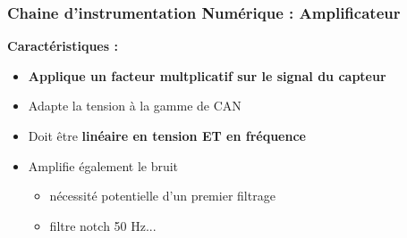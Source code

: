 \documentclass{beamer}
\begin{document}
\begin{frame}
\frametitle{Chaine d'instrumentation Numérique : Amplificateur}
\begin{center}
\end{center}
\vspace{0.1cm}
\textbf{Caractéristiques :}\\
\vspace{0.1cm}
\begin{itemize}
\item \textbf{Applique un facteur multplicatif sur le signal du capteur}
\vspace{0.1cm}
\item Adapte la tension à la gamme de CAN
\vspace{0.1cm}
\item Doit être \textbf{linéaire en tension ET en fréquence}
\vspace{0.1cm}
\item Amplifie également le bruit 
\vspace{0.1cm}
\begin{itemize}
\item nécessité potentielle d'un premier filtrage 
\vspace{0.1cm}
\item  filtre notch 50 Hz...
\end{itemize}
\end{itemize}
\end{frame}
\end{document}
